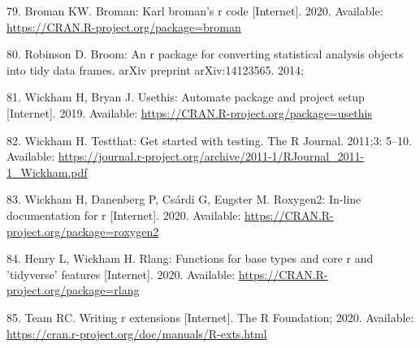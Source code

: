 \documentclass[10pt,letterpaper]{article}
\begin{document}
\leavevmode\hypertarget{ref-broman}{}%
79. Broman KW. Broman: Karl broman's r code {[}Internet{]}. 2020.
Available: \url{https://CRAN.R-project.org/package=broman}

\leavevmode\hypertarget{ref-robinson2014}{}%
80. Robinson D. Broom: An r package for converting statistical analysis
objects into tidy data frames. arXiv preprint arXiv:14123565. 2014;

\leavevmode\hypertarget{ref-usethis}{}%
81. Wickham H, Bryan J. Usethis: Automate package and project setup
{[}Internet{]}. 2019. Available:
\url{https://CRAN.R-project.org/package=usethis}

\leavevmode\hypertarget{ref-testthat}{}%
82. Wickham H. Testthat: Get started with testing. The R Journal.
2011;3: 5--10. Available:
\url{https://journal.r-project.org/archive/2011-1/RJournal_2011-1_Wickham.pdf}

\leavevmode\hypertarget{ref-roxygen2}{}%
83. Wickham H, Danenberg P, Csárdi G, Eugster M. Roxygen2: In-line
documentation for r {[}Internet{]}. 2020. Available:
\url{https://CRAN.R-project.org/package=roxygen2}

\leavevmode\hypertarget{ref-rlang}{}%
84. Henry L, Wickham H. Rlang: Functions for base types and core r and
'tidyverse' features {[}Internet{]}. 2020. Available:
\url{https://CRAN.R-project.org/package=rlang}

\leavevmode\hypertarget{ref-Rcore2020}{}%
85. Team RC. Writing r extensions {[}Internet{]}. The R Foundation;
2020. Available:
\url{https://cran.r-project.org/doc/manuals/R-exts.html}

\nolinenumbers
\end{document}
